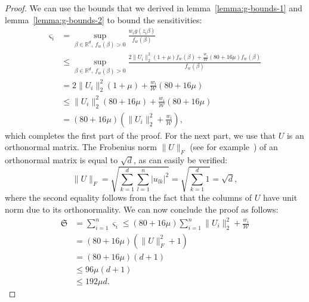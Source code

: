 \begin{proof}
    We can use the bounds that we derived in lemma~\ref{lemma:g-bounds-1}
    and lemma~\ref{lemma:g-bounds-2} to bound the sensitivities:
    \begin{align*}
        \varsigma_i
         & = \sup_{\beta \in \mathbb{R}^d,\ f_w(\beta)>0} \frac{w_i g(z_i \beta)}{f_w(\beta)}                   \\
         & \leq \sup_{\beta \in \mathbb{R}^d,\ f_w(\beta)>0} \frac{2 \lVert U_i \rVert_2^2 (1 + \mu) f_w(\beta)
            + \frac{w_i}{\mathcal{W}} (80 + 16 \mu) f_w(\beta)}{f_w(\beta)}                                     \\
         & = 2 \lVert U_i \rVert_2^2 (1 + \mu) + \frac{w_i}{\mathcal{W}} (80 + 16 \mu)                          \\
         & \leq \lVert U_i \rVert_2^2 (80 + 16 \mu) +  \frac{w_i}{\mathcal{W}} (80 + 16 \mu)                    \\
         & = (80 + 16\mu)(\lVert U_i \rVert_2^2 + \frac{w_i}{\mathcal{W}}),
    \end{align*}
    which completes the first part of the proof.
    For the next part, we use that $U$ is an orthonormal matrix.
    The Frobenius norm $\lVert U \rVert_F$
    (see for example~\cite{matrix-computations}) of an orthonormal matrix
    is equal to $\sqrt{d}$, as can easily be verified:
    \begin{equation*}
        \lVert U \rVert_F = \sqrt{\sum_{k=1}^d \sum_{l=1}^n \lvert u_{lk} \rvert^2}
        = \sqrt{\sum_{k=1}^d 1} = \sqrt{d},
    \end{equation*}
    where the second equality follows from the fact that the columns of
    $U$ have unit norm due to its orthonormality. We can now conclude the
    proof as follows:
    \begin{align*}
        \mathfrak{S}
         & = \sum_{i=1}^n \varsigma_i \leq (80 + 16\mu) \sum_{i=1}^n \lVert U_i \rVert_2^2 + \frac{w_i}{\mathcal{W}} \\
         & = (80 + 16 \mu)(\lVert U \rVert_F^2 + 1)                                                                  \\
         & = (80 + 16 \mu)(d + 1)                                                                                    \\
         & \leq 96 \mu(d + 1)                                                                                        \\
         & \leq 192 \mu d.
    \end{align*}
\end{proof}